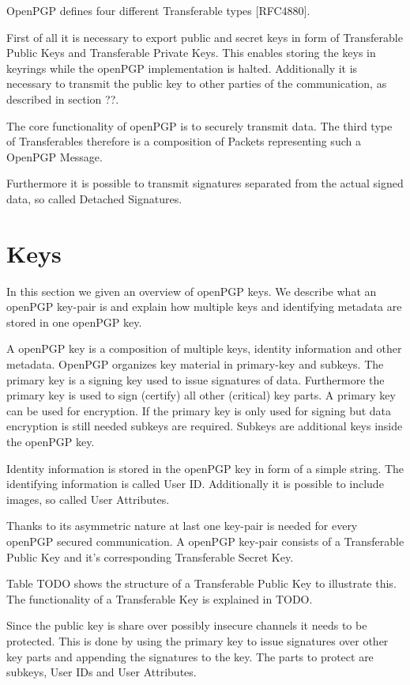 OpenPGP defines four different Transferable types [RFC4880].

First of all it is necessary to export public and secret keys in form of Transferable Public Keys and Transferable Private Keys. This enables storing the keys in keyrings while the openPGP implementation is halted. Additionally it is necessary to transmit the public key to other parties of the communication, as described in section ??. 

The core functionality of openPGP is to securely transmit data. The third type of Transferables therefore is a composition of Packets representing such a OpenPGP Message.

Furthermore it is possible to transmit signatures separated from the actual signed data, so called Detached Signatures.

\section{Keys}

In this section we given an overview of openPGP keys. We describe what an openPGP key-pair is and explain how multiple keys and identifying metadata are stored in one openPGP key.

A openPGP key is a composition of multiple keys, identity information and other metadata. OpenPGP organizes key material in primary-key and subkeys. The primary key is a signing key used to issue signatures of data. Furthermore the primary key is used to sign (certify) all other (critical) key parts. A primary key can be used for encryption. If the primary key is only used for  signing but data encryption is still needed subkeys are required. Subkeys are additional keys inside the openPGP key.

Identity information is stored in the openPGP key in form of a simple string. The identifying information is called User ID. Additionally it is possible to include images, so called User Attributes.

Thanks to its asymmetric nature at last one key-pair is needed for every openPGP secured communication. A openPGP key-pair consists of a Transferable Public Key and it's corresponding Transferable Secret Key. 

Table TODO shows the structure of a Transferable Public Key to illustrate this. The functionality of a Transferable  Key is explained in  TODO.


Since the public key is share over possibly insecure channels it needs to be protected. This is done by using the primary key to issue signatures over other key parts and appending the signatures to the key. The parts to protect are subkeys, User IDs and User Attributes.


